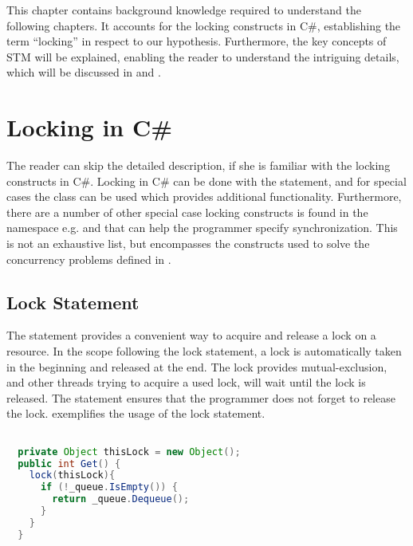 \makeatletter {}\makeatother
{}
This chapter contains background knowledge required to understand the following chapters. It accounts for the locking constructs in C\#, establishing the term ``locking''  in respect to our hypothesis. Furthermore, the key concepts of \ac{STM} will be explained, enabling the reader to understand the intriguing details, which will be discussed in  and .
\label{chap:prelim}
\section{Locking in C\#}\label{sec:locking}
The reader can skip the detailed description, if she is familiar with the locking constructs in C\#. Locking in C\# can be done with the  statement, and for special cases the  class can be used which provides additional functionality. Furthermore, there are a number of other special case locking constructs is found in the  namespace e.g. \cite{microsoftSyncPrim,}    and  that can help the programmer specify synchronization. This is not an exhaustive list, but encompasses the constructs used to solve the concurrency problems defined in .
\subsection{Lock Statement}\label{subsec:lock_statement}
The  statement\cite[p. 102]{csharp2013specificaiton} provides a convenient way to acquire and release a lock on a resource. In the scope following the lock statement, a lock is automatically taken in the beginning and released at the end. The lock provides mutual-exclusion, and other threads trying to acquire a used lock, will wait until the lock is released. The  statement ensures that the programmer does not forget to release the lock.  exemplifies the usage of the lock statement. 
\begin{lstlisting}[float, label=lst:lock_statement,
  caption={Lock Statement},
  language=Java,  
  showspaces=false,
  showtabs=false,
  breaklines=true,
  showstringspaces=false,
  breakatwhitespace=true,
  commentstyle=\color{greencomments},
  keywordstyle=\color{bluekeywords},
  stringstyle=\color{redstrings},
  morekeywords={atomic, retry, orElse}]  % Start your code-block

  private Object thisLock = new Object();
  public int Get() { 
    lock(thisLock){
      if (!_queue.IsEmpty()) {
        return _queue.Dequeue();
      }
    }
  }
\end{lstlisting}
